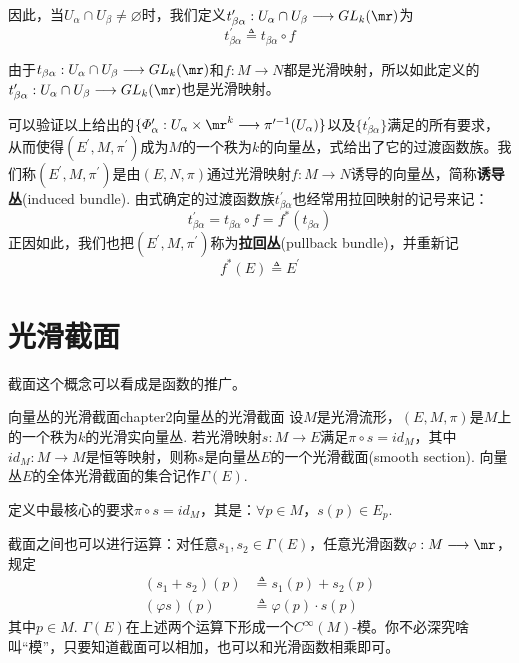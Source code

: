  因此，当$U_{\alpha}\cap U_{\beta}\neq\varnothing$时，我们定义$t^{\prime}_{\beta\alpha}:U_{\alpha}\cap U_{\beta}\longrightarrow GL_{k}(\mr)$为
 \begin{equation}
	 t^{\prime}_{\beta\alpha}\triangleq t_{\beta\alpha}\circ f
	 \label{拉回丛的过渡函数}
 \end{equation}
 
 由于$t_{\beta\alpha}:U_{\alpha}\cap U_{\beta}\longrightarrow GL_{k}(\mr)$和$f:M\longrightarrow N$都是光滑映射，所以如此定义的$t^{\prime}_{\beta\alpha}:U_{\alpha}\cap U_{\beta}\longrightarrow GL_{k}(\mr)$也是光滑映射。
 
 可以验证以上给出的$\{\varPhi^{\prime}_{\alpha} :U_{\alpha}\times \mr^{k}\longrightarrow \pi^{\prime -1}(U_{\alpha})\}$以及$\{ t^{\prime}_{\beta\alpha} \}$满足的所有要求，从而使得$(E^{\prime},M,\pi^{\prime})$成为$M$的一个秩为$k$的向量丛，式给出了它的过渡函数族。我们称$(E^{\prime},M,\pi^{\prime})$是由$(E,N,\pi)$通过光滑映射$f:M\longrightarrow N$诱导的向量丛，简称\textbf{诱导丛}(induced bundle). 由式确定的过渡函数族$t^{\prime}_{\beta\alpha}$也经常用拉回映射的记号来记：
\[
	 t^{\prime}_{\beta\alpha}= t_{\beta\alpha}\circ f=f^{\ast}(t_{\beta\alpha})
 \]
 正因如此，我们也把$(E^{\prime},M,\pi^{\prime})$称为\textbf{拉回丛}(pullback bundle)，并重新记
 \[
	f^{\ast}(E)\triangleq E^{\prime}
 \]

\section{光滑截面}

截面这个概念可以看成是函数的推广。

\begin{mydef}{向量丛的光滑截面}{chapter2向量丛的光滑截面}
设$M$是光滑流形，$(E,M,\pi)$是$M$上的一个秩为$k$的光滑实向量丛. 若光滑映射$s:M\longrightarrow E$满足$\pi\circ s= id_{M}$，其中$id_{M}:M\longrightarrow M$是恒等映射，则称$s$是向量丛$E$的一个光滑截面(smooth section). 向量丛$E$的全体光滑截面的集合记作$\Gamma(E)$.
\end{mydef}

定义中最核心的要求$\pi\circ s= id_{M}$，其{\color{red}{等价表述}}是：$\forall p\in M$，$s(p)\in E_{p}$.

截面之间也可以进行运算：对任意$ s_{1},s_{2}\in \Gamma(E)$，任意光滑函数$\varphi:M\longrightarrow \mr$，规定
\begin{equation}
\begin{split}
	\left( s_{1}+s_{2} \right)(p)&\triangleq s_{1}(p)+s_{2}(p)\\
	\left( \varphi s\right)(p)&\triangleq \varphi(p)\cdot s(p)
\end{split}
\label{截面之间的加法与数乘}
\end{equation}
其中$p\in M$. $\Gamma(E)$在上述两个运算下形成一个$C^{\infty}(M)$-模。你不必深究啥叫“模”，只要知道截面可以相加，也可以和光滑函数相乘即可。

